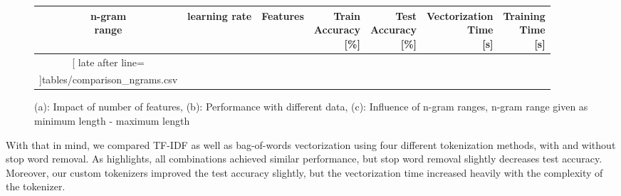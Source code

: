 \documentclass[10pt]{article}
\begin{document}
\begin{figure}[htbp]
\begin{minipage}[t]{0.6\textwidth}
			
			\vspace{10pt} %
			
			\small
			\setlength{\tabcolsep}{4pt}
			\renewcommand{\arraystretch}{1.1}
			\begin{adjustbox}{scale=.8, valign=t}
				\begin{tabular}{|c|c|r|r|r|r|r|}
					\hline
					\rowcolor{gray!30}
					\bfseries \makecell{n-gram\\range} & 
					\bfseries{learning rate} &
					\bfseries Features & 
					\bfseries \makecell{Train\\Accuracy\\{\footnotesize[\%]}} & 
					\bfseries \makecell{Test\\Accuracy\\{\footnotesize[\%]}} & 
					\bfseries \makecell{Vectorization\\Time\\{\footnotesize[s]}} & 
					\bfseries \makecell{Training\\Time\\{\footnotesize[s]}} \\
					\hline
					\csvreader[
					late after line=\\\hline
					]{tables/comparison_ngrams.csv}{}%
					{\csvcoli & \csvcolii & \csvcoliii & \csvcoliv & \csvcolv & \csvcolvi & \csvcolvii}%
				\end{tabular}
			\end{adjustbox}
			\subcaption{}
		\end{minipage}
		
		\caption{(a): Impact of number of features, (b): Performance with different data, (c): Influence of n-gram ranges, n-gram range given as minimum length - maximum length}
		\label{Fig 2}
	\end{figure}
	

	
		
	With that in mind, we compared TF-IDF as well as bag-of-words vectorization using four different tokenization methods, with and without stop word removal. As  highlights, all combinations achieved similar performance, but stop word removal slightly decreases test accuracy. Moreover, our custom tokenizers improved the test accuracy slightly, but the vectorization time increased heavily with the complexity of the tokenizer. \newline\newline
	
\end{document}
